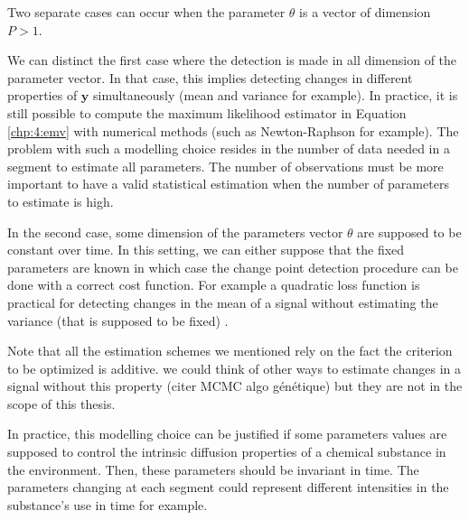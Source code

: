 Two separate cases can occur when the parameter $\theta$ is a vector of dimension $P > 1$.     

We can distinct the first case where the detection is made in all dimension of the parameter vector. In that case, this implies detecting changes in different properties of $\bm y$ simultaneously (mean and variance for example). In practice, it is still possible to compute the maximum likelihood estimator in Equation \ref{chp:4:emv} with numerical methods (such as Newton-Raphson for example). The problem with such a modelling choice resides in the number of data needed in a segment to estimate all parameters. The number of observations must be more important to have a valid statistical estimation when the number of parameters to estimate is high.  

In the second case, some dimension of the parameters vector $\theta$ are supposed to be constant over time. In this setting, we can either suppose that the fixed parameters are known in which case the change point detection procedure can be done with a correct cost function. For example a quadratic loss function is practical for detecting changes in the mean of a signal without estimating the variance (that is supposed to be fixed) \citep{Fearnhead2018a}. 

Note that all the estimation schemes we mentioned rely on the fact the criterion to be optimized is additive. we could think of other ways to estimate changes in a signal without this property (citer MCMC algo génétique) but they are not in the scope of this thesis.  

In practice, this modelling choice can be justified if some parameters values are supposed to control the intrinsic diffusion properties of a chemical substance in the environment. Then, these parameters should be invariant in time. The parameters changing at each segment could represent different intensities in the substance's use in time for example. 

